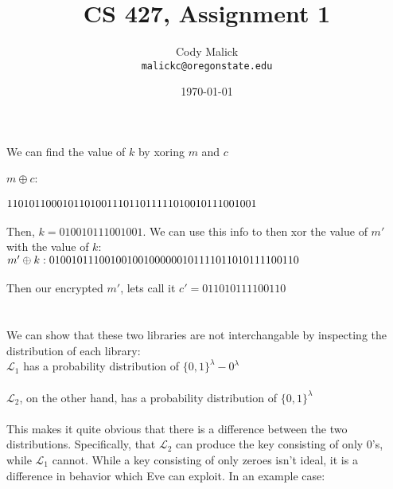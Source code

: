\documentclass[10pt,letterpaper]{article}
\begin{document}
  \title{CS 427, Assignment 1}
  \author{Cody Malick\\
  \texttt{malickc@oregonstate.edu}}
  \date{\today}
  \maketitle

\section{}
	We can find the value of $k$ by xoring $m$ and $c$\\\\
	$m \oplus c:$\\\\
	$110101100010110\\
	100111011011111\\
	\\
	010010111001001$\\\\
	\noindent Then, $k=010010111001001$. We can use this info to then xor
	the value of $m'$ with the value of $k$:\\
	
	\noindent $m' \oplus k:\\\\
	010010111001001\\
	001000000101111\\
	\\
	011010111100110$\\\\
	
	\noindent Then our encrypted $m'$, lets call it $c' = 011010111100110$

\section{}
	We can show that these two libraries are not interchangable by
	inspecting the distribution of each library:\\

	$\mathcal{L}_1$ has a probability distribution of
	$\{0,1\}^\lambda - 0^\lambda$\\\\

	$\mathcal{L}_2$, on the other hand, has a probability distribution of
	$\{0,1\}^\lambda$\\\\

	This makes it quite obvious that there is a difference between the two
	distributions. Specifically, that $\mathcal{L}_2$ can produce the key
	consisting of only 0's, while $\mathcal{L}_1$ cannot. While a key
	consisting of only zeroes isn't ideal, it is a difference in behavior
	which Eve can exploit. In an example case:\\
\end{document}
